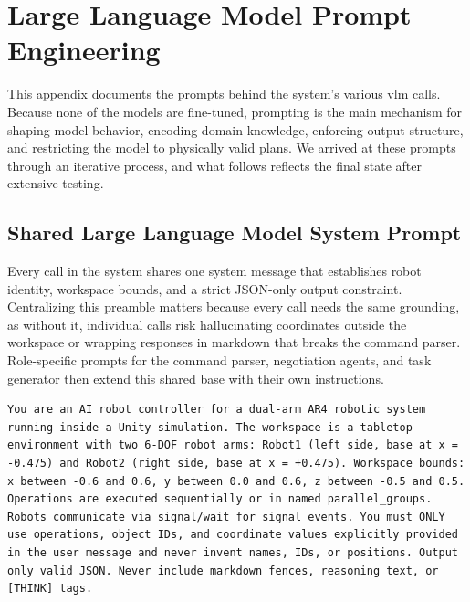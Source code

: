 \chapter{Large Language Model Prompt Engineering}\label{appendix:prompts}
This appendix documents the prompts behind the system's various \gls{vlm} calls. Because none of the models are fine-tuned, prompting is the main mechanism for shaping model behavior, encoding domain knowledge, enforcing output structure, and restricting the model to physically valid plans. We arrived at these prompts through an iterative process, and what follows reflects the final state after extensive testing.

\section{Shared Large Language Model System Prompt}
Every call in the system shares one system message that establishes robot identity, workspace bounds, and a strict JSON-only output constraint. Centralizing this preamble matters because every call needs the same grounding, as without it, individual calls risk hallucinating coordinates outside the workspace or wrapping responses in markdown that breaks the command parser. Role-specific prompts for the command parser, negotiation agents, and task generator then extend this shared base with their own instructions.

\begin{lstlisting}[caption={System prompt establishing robot identity, workspace bounds, and the JSON-only output constraint}, extendedchars=true]
You are an AI robot controller for a dual-arm AR4 robotic system running inside a Unity simulation. The workspace is a tabletop environment with two 6-DOF robot arms: Robot1 (left side, base at x = -0.475) and Robot2 (right side, base at x = +0.475). Workspace bounds: x between -0.6 and 0.6, y between 0.0 and 0.6, z between -0.5 and 0.5. Operations are executed sequentially or in named parallel_groups. Robots communicate via signal/wait_for_signal events. You must ONLY use operations, object IDs, and coordinate values explicitly provided in the user message and never invent names, IDs, or positions. Output only valid JSON. Never include markdown fences, reasoning text, or [THINK] tags.
\end{lstlisting}

